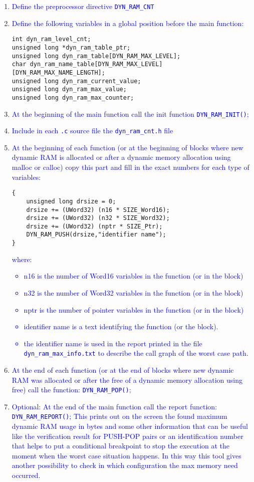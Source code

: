 \begin{enumerate}
\item \textcolor{blue}{%
Define the preprocessor directive {\tt DYN\_RAM\_CNT}
}
\item \textcolor{blue}{%
Define the following variables in a global position before the
main function:
}
\begin{verbatim}
int dyn_ram_level_cnt;
unsigned long *dyn_ram_table_ptr;
unsigned long dyn_ram_table[DYN_RAM_MAX_LEVEL];
char dyn_ram_name_table[DYN_RAM_MAX_LEVEL][DYN_RAM_MAX_NAME_LENGTH];
unsigned long dyn_ram_current_value;
unsigned long dyn_ram_max_value;
unsigned long dyn_ram_max_counter;
\end{verbatim}
\item \textcolor{blue}{%
At the beginning of the main function call the init function
  {\tt DYN\_RAM\_INIT()};
}
\item \textcolor{blue}{%
Include in each {\tt .c} source file the {\tt dyn\_ram\_cnt.h} file
}
\item \textcolor{blue}{%
At the beginning of each function (or at the beginning of blocks
  where new dynamic RAM is allocated or after a dynamic memory
  allocation using malloc or calloc) copy this part and fill in the
  exact numbers for each type of variables:
}
\begin{verbatim}
{
    unsigned long drsize = 0;
    drsize += (UWord32) (n16 * SIZE_Word16);
    drsize += (UWord32) (n32 * SIZE_Word32);
    drsize += (UWord32) (nptr * SIZE_Ptr);
    DYN_RAM_PUSH(drsize,"identifier name");
}
\end{verbatim}
\textcolor{blue}{%
where:
\begin{itemize}
\item n16 is the number of Word16 variables in the function (or in the block)
\item n32 is the number of Word32 variables in the function (or in the block)
\item nptr is the number of pointer variables in the function (or in the block)
\item identifier name is a text identifying the function (or the
  block).
\item the identifier name is used in the report printed in the file
{\tt dyn\_ram\_max\_info.txt} to describe the call graph of the worst case
path. 
\end{itemize}
}
\item \textcolor{blue}{%
  At the end of each function (or at the end of blocks where new
  dynamic RAM was allocated or after the free of a dynamic memory
  allocation using free) call the function: {\tt DYN\_RAM\_POP()};
}
\item \textcolor{blue}{%
  Optional: At the end of the main function call the report
  function: {\tt DYN\_RAM\_REPORT()}; This prints out on the screen
  the found maximum dynamic RAM usage in bytes and some other
  information that can be useful like the verification result for
  PUSH-POP pairs or an identification number that helps to put a
  conditional breakpoint to stop the execution at the moment when the
  worst case situation happens. In this way this tool gives another
  possibility to check in which configuration the max memory need
  occurred.
}
\end{enumerate}

